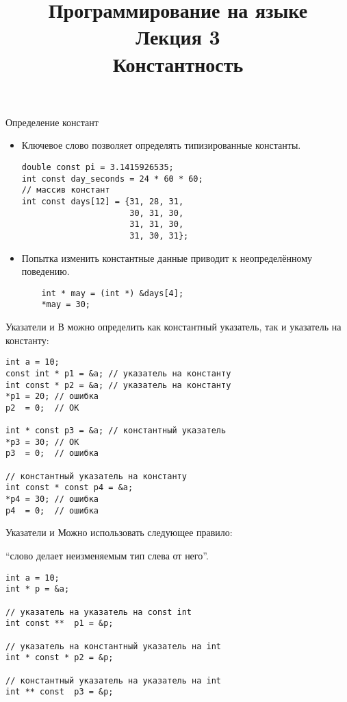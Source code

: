 \documentclass{beamer}
\title{{\bf Программирование на языке \langcpp\protect\\Лекция
3\protect\vspace{1em}\\}Константность}
\begin{document}
\begin{frame} 
  \titlepage
\end{frame}

\begin{frame}[fragile]{Определение констант}{}
    \begin{itemize}
        \item Ключевое слово  позволяет
            определять типизированные константы.
\begin{lstlisting}
double const pi = 3.1415926535;
int const day_seconds = 24 * 60 * 60;   
// массив констант
int const days[12] = {31, 28, 31,
                      30, 31, 30,
                      31, 31, 30,
                      31, 30, 31};
\end{lstlisting}
        \item Попытка изменить константные данные приводит к неопределённому
            поведению.
\begin{lstlisting}
    int * may = (int *) &days[4];
    *may = 30;
\end{lstlisting}
    \end{itemize}
\end{frame}

\begin{frame}[fragile]{Указатели и }{}
В \langcpp можно определить как константный указатель,
так и указатель на константу:
\begin{lstlisting}
int a = 10;
const int * p1 = &a; // указатель на константу
int const * p2 = &a; // указатель на константу
*p1 = 20; // ошибка
p2  = 0;  // ОК

int * const p3 = &a; // константный указатель
*p3 = 30; // OK
p3  = 0;  // ошибка

// константный указатель на константу
int const * const p4 = &a;
*p4 = 30; // ошибка
p4  = 0;  // ошибка
\end{lstlisting}
\end{frame}

\begin{frame}[fragile]{Указатели и }{}
    Можно использовать следующее правило:\\
    \begin{center}
    ``слово  делает неизменяемым тип слева от него''.
    \end{center}

\begin{lstlisting}
int a = 10;
int * p = &a;   

// указатель на указатель на const int
int const **  p1 = &p;

// указатель на константный указатель на int
int * const * p2 = &p;

// константный указатель на указатель на int
int ** const  p3 = &p;
\end{lstlisting}
\end{frame}
\end{document}
